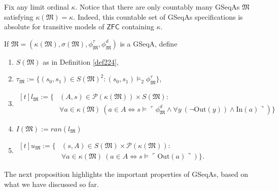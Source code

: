 \documentclass[12pt]{article}
\numberwithin{equation}{section}
\begin{document}
\begin{rem}\label{rem225}
Fix any limit ordinal $\kappa$. Notice that there are only countably many GSeqAs $\mathfrak{M}$ satisfying $\kappa(\mathfrak{M}) = \kappa$. Indeed, this countable set of GSeqAs specifications is absolute for transitive models of $\mathsf{ZFC}$ containing $\kappa$.
\end{rem}

\begin{defi}
If $\mathfrak{M} = (\kappa(\mathfrak{M}), \sigma(\mathfrak{M}), \phi^{\tau}_{\mathfrak{M}}, \phi^d_{\mathfrak{M}})$ is a GSeqA, define 
\begin{enumerate}[label=(\arabic*)]
    \item $S(\mathfrak{M})$ as in Definition \ref{def224},
    \item $\tau_{\mathfrak{M}} := \{(s_0, s_1) \in S(\mathfrak{M})^2 : (s_0, s_1) \models_2 \phi^{\tau}_{\mathfrak{M}}\}$,
    \item 
    \!
    $\begin{aligned}[t]
       l_{\mathfrak{M}} := \{ & (A, s) \in \mathcal{P}(\kappa(\mathfrak{M})) \times S(\mathfrak{M}) : \\
       & \forall a \in \kappa(\mathfrak{M}) \ (a \in A \iff s \models \ulcorner \phi^d_{\mathfrak{M}} \wedge \forall y \ (\neg \mathrm{Out}(y)) \wedge \mathrm{In}(a) \urcorner)\} 
    \end{aligned}$
    \item $I(\mathfrak{M}) := ran(l_{\mathfrak{M}})$
    \item 
    \!
    $\begin{aligned}[t]
        u_{\mathfrak{M}} := \{ & (s, A) \in S(\mathfrak{M}) \times \mathcal{P}(\kappa(\mathfrak{M})) : \\
        & \forall a \in \kappa(\mathfrak{M}) \ (a \in A \iff s \models \ulcorner \mathrm{Out}(a) \urcorner)\} \text{.}
    \end{aligned}$
\end{enumerate}
\end{defi}

The next proposition highlights the important properties of GSeqAs, based on what we have discussed so far.
\end{document}
